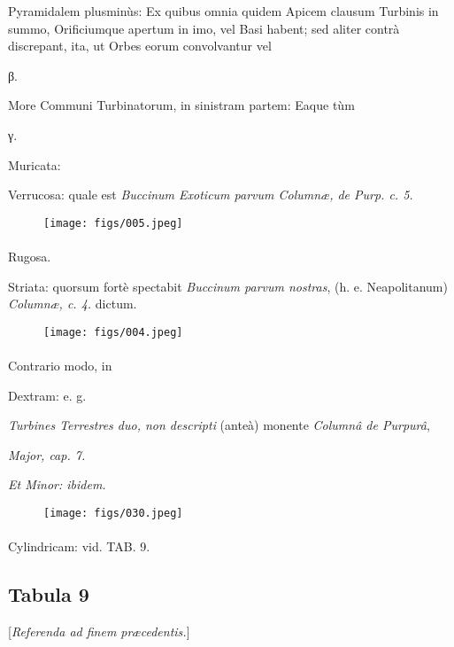 \documentclass[a4paper, 11pt, oneside, polutonikogreek, german]{article}
\begin{document}
Pyramidalem plusminùs: Ex quibus omnia quidem Apicem clausum Turbinis in summo, Orificiumque apertum in imo, vel Basi habent; sed aliter contrà discrepant, ita, ut Orbes eorum convolvantur vel

β.

More Communi Turbinatorum, in sinistram partem: Eaque tùm

γ.

Muricata:

Verrucosa: quale est \emph{Buccinum Exoticum parvum Columnæ, de Purp. c. 5.}

\begin{figure}[H]
\centering
\texttt{[image: figs/005.jpeg]}
\end{figure}
\paragraph{}
Rugosa.

Striata: quorsum fortè spectabit \emph{Buccinum parvum nostras}, (h. e. Neapolitanum) \emph{Columnæ, c. 4.} dictum.

\begin{figure}[H]
\centering
\texttt{[image: figs/004.jpeg]}
\end{figure}
\paragraph{}
Contrario modo, in

Dextram: e. g.

\emph{Turbines Terrestres duo, non descripti} (anteà) monente \emph{Columnâ de Purpurâ},

\emph{Major, cap. 7.}

\emph{Et Minor: ibidem.}

\begin{figure}[H]
\centering
\texttt{[image: figs/030.jpeg]}
\end{figure}
\paragraph{}
Cylindricam: vid. TAB. 9.
\clearpage
\subsection{Tabula 9}
\begin{center}
[\emph{Referenda ad finem præcedentis.}]
\end{center}
\end{document}

